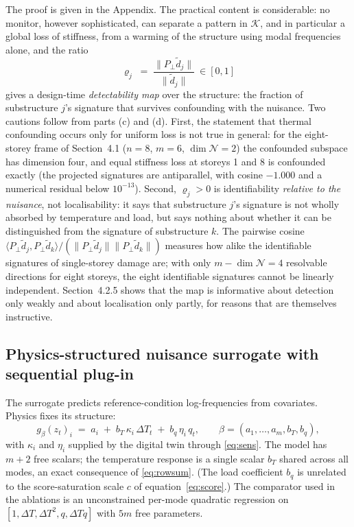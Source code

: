\documentclass[12pt,a4paper]{article}
\newcommand{\rev}[1]{#1}
\newenvironment{revblock}{}{}
\newcommand{\rev}[1]{{\color{revcol}#1}}
\newenvironment{revblock}{\begingroup\color{revcol}}{\endgroup}
\begin{document}
The proof is given in the Appendix. The practical content is considerable: no monitor, however sophisticated, can separate \rev{a pattern in $\mathcal{K}$, and in particular} a global loss of stiffness, from a warming of the structure using modal frequencies alone, and the ratio
\begin{equation}
\varrho_j \;=\; \frac{\|P_\perp \tilde d_j\|}{\|\tilde d_j\|}\ \in[0,1]
\label{eq:retention}
\end{equation}
gives a design-time \emph{detectability map} over the structure: the fraction of substructure $j$'s signature that survives confounding with the nuisance. \begin{revblock}Two cautions follow from parts (c) and (d). First, the statement that thermal confounding occurs only for uniform loss is not true in general: for the eight-storey frame of Section~4.1 ($n=8$, $m=6$, $\dim\mathcal{N}=2$) the confounded subspace has dimension four, and equal stiffness loss at storeys 1 and 8 is confounded exactly (the projected signatures are antiparallel, with cosine $-1.000$ and a numerical residual below $10^{-13}$). Second, $\varrho_j>0$ is identifiability \emph{relative to the nuisance}, not localisability: it says that substructure $j$'s signature is not wholly absorbed by temperature and load, but says nothing about whether it can be distinguished from the signature of substructure $k$. The pairwise cosine $\langle P_\perp\tilde d_j,P_\perp\tilde d_k\rangle/(\|P_\perp\tilde d_j\|\|P_\perp\tilde d_k\|)$ measures how alike the identifiable signatures of single-storey damage are; with only $m-\dim\mathcal{N}=4$ resolvable directions for eight storeys, the eight identifiable signatures cannot be linearly independent.\end{revblock} Section~4.2.5 shows that the map is informative about \rev{detection only weakly and about} localisation \rev{only partly}, for reasons that are themselves instructive.


\subsection{Physics-structured nuisance surrogate with sequential plug-in}

The surrogate predicts reference-condition log-frequencies from covariates. Physics fixes its structure:
\begin{equation}
g_\beta(z_t)_i \;=\; a_i \;+\; b_T\,\kappa_i\,\Delta T_t \;+\; \rev{b_q}\,\eta_i\, q_t ,
\qquad \beta=(a_1,\dots,a_m,b_T,\rev{b_q}),
\label{eq:surrogate}
\end{equation}
with $\kappa_i$ and $\eta_i$ supplied by the digital twin through \eqref{eq:sens}. The model has $m+2$ free scalars; the temperature response is a single scalar \rev{$b_T$} shared across all modes, an exact consequence of \eqref{eq:rowsum}. \rev{(The load coefficient $b_q$ is unrelated to the score-saturation scale $c$ of equation~\eqref{eq:score}.)} The comparator used in the ablations is an unconstrained per-mode quadratic regression on $[1,\Delta T,\Delta T^2,q,\Delta T q]$ with $5m$ free parameters.
\end{document}
